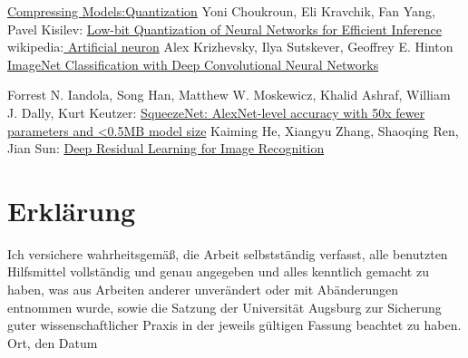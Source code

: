 \documentclass[12pt,a4paper]{scrartcl}
\numberwithin{equation}{section}
\begin{document}
\begin{thebibliography}{lem00}
		\href{https://nervanasystems.github.io/distiller/quantization.html}{Compressing Models:Quantization}
		Yoni Choukroun, Eli Kravchik, Fan Yang, Pavel Kisilev:
			\href{https://arxiv.org/abs/1902.06822}{Low-bit Quantization of Neural Networks for Efficient Inference}
	wikipedia:\href{https://en.wikipedia.org/wiki/Artificial_neuron}{ Artificial neuron}
	Alex Krizhevsky, Ilya Sutskever, Geoffrey E. Hinton
		\href{https://papers.nips.cc/paper/4824-imagenet-classification-with-deep-convolutional-neural-networks.pdf}{ImageNet Classification with Deep Convolutional Neural Networks}
  
  	Forrest N. Iandola, Song Han, Matthew W. Moskewicz, Khalid Ashraf, William J. Dally, Kurt Keutzer:
  	\href{https://arxiv.org/abs/1602.07360}{SqueezeNet: AlexNet-level accuracy with 50x fewer parameters and <0.5MB model size}
  		Kaiming He, Xiangyu Zhang, Shaoqing Ren, Jian Sun:
  		\href{https://arxiv.org/pdf/1512.03385.pdf}{Deep Residual Learning for Image Recognition}
\end{thebibliography}

 
      

\newpage
  
 \thispagestyle{empty}


\vspace*{8cm}


\section*{Erklärung}

Ich  versichere  wahrheitsgemäß,  die  Arbeit selbstständig verfasst,  alle  benutzten  Hilfsmittel  vollständig  und  genau  angegeben  und  alles kenntlich  gemacht  zu  haben,  was  aus  Arbeiten  anderer  unverändert  oder  mit  Abänderungen entnommen  wurde,  sowie die Satzung  der  Universität Augsburg  zur  Sicherung guter wissenschaftlicher Praxis in der jeweils gültigen Fassung beachtet zu haben.
\\[2ex] 

\noindent
Ort, den Datum\\[5ex]

\end{document}
